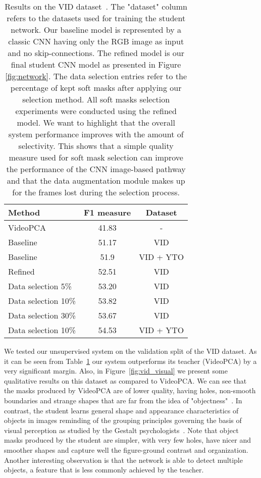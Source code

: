 \documentclass[10pt,twocolumn,letterpaper]{article}
\begin{document}
\begin{table}[t]
\begin{center}
\begin{tabular}{|l|c|c|}
\hline
Method & F1 measure & Dataset \\
\hline\hline
VideoPCA~\cite{stretcu2015multiple} & 41.83 & - \\
\hline
Baseline & 51.17 & VID \\
Baseline & 51.9 & VID + YTO \\
Refined & 52.51 & VID \\
Data selection 5\% & 53.20 & VID\\
Data selection 10\% & 53.82 & VID\\
Data selection 30\% & 53.67 & VID\\
Data selection 10\% & 54.53 & VID + YTO\\
\hline
\end{tabular}
\end{center}
\caption{Results on the VID dataset~\cite{russakovsky2015imagenet}. The "dataset" column refers to the datasets used for training the student network. Our baseline model is represented by a classic CNN having only the RGB image as input and no skip-connections. The refined model is our final student CNN model as presented in Figure \ref{fig:network}.
The data selection entries refer to the percentage of kept soft masks after applying our selection method. All soft masks selection experiments were conducted using the refined model. We want to highlight that the overall system performance improves with the amount of selectivity. This shows that a simple quality measure used for soft mask selection can improve the performance of the CNN image-based pathway and that the data augmentation module makes up for the frames lost during the selection process.}
\label{tab:vid}
\end{table}

We tested our unsupervised system on the validation split of the VID dataset. As it can be seen from Table~\ref{tab:vid} our system outperforms its teacher (VideoPCA) by a very significant margin.
Also, in Figure~\ref{fig:vid_visual} we present some qualitative results on this dataset as compared to VideoPCA. We can see that the masks produced by VideoPCA are of lower quality, having holes, non-smooth boundaries and strange shapes that are far from the idea of "objectness"~\cite{alexe2010object}. In contrast, the student learns general shape and appearance characteristics of objects in images reminding of the grouping principles governing the basis of visual perception as studied by the Gestalt psychologists~\cite{rock1990gestalt}. Note that object masks produced by the student are simpler, with very few holes, have nicer and smoother shapes 
and capture well the figure-ground contrast and organization. Another interesting observation is that the network is able to detect multiple objects, a feature that is less commonly achieved by the teacher.
 
\end{document}
